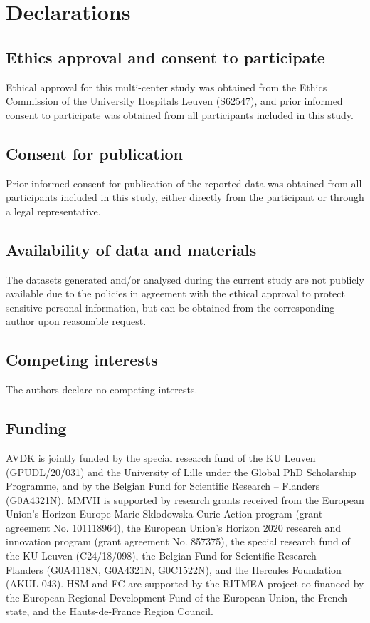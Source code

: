 \documentclass{article}
\begin{document}
\printacronyms%

\section*{Declarations}
\subsection*{Ethics approval and consent to participate}
Ethical approval for this multi-center study was obtained from the Ethics
Commission of the University Hospitals Leuven (S62547),
and prior informed consent to participate  was obtained from
all participants included in this study.

\subsection*{Consent for publication}
Prior informed consent for publication of the reported data was obtained from
all participants included in this study, either directly from the participant or
through a legal representative.

\subsection*{Availability of data and materials}

The datasets generated and/or analysed during the current study are not publicly
available due to the policies in agreement with the ethical approval to protect
sensitive personal information, but can be obtained from the corresponding author
upon reasonable request.

\subsection*{Competing interests}
The authors declare no competing interests.

\subsection*{Funding}
AVDK is jointly funded by the special research fund of the KU Leuven (GPUDL/20/031) and
the University of Lille under the Global PhD Scholarship Programme, and by
the Belgian Fund for Scientific Research – Flanders (G0A4321N).
MMVH is supported by research grants received from the European Union’s
Horizon Europe Marie Sklodowska-Curie Action program
(grant agreement No. 101118964), the European Union’s Horizon 2020 research and
innovation program (grant agreement No. 857375), the special research fund of
the KU Leuven (C24/18/098), the Belgian Fund for Scientific Research – Flanders
(G0A4118N, G0A4321N, G0C1522N), and the Hercules Foundation (AKUL 043).
HSM and FC are supported by the RITMEA project co-financed by the
European Regional Development Fund of the European Union, the French state,
and the Hauts-de-France Region Council.
\end{document}
